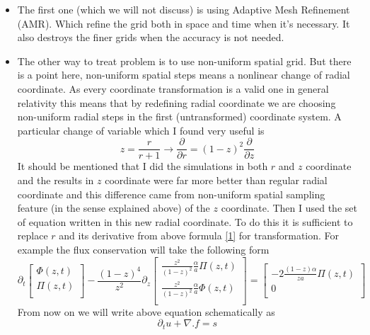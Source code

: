 \documentclass[a4paper,11pt]{article}
\begin{document}
\begin{itemize}
	\item The first one (which we will not discuss) is using Adaptive Mesh Refinement (AMR). Which refine the grid both in space and time  when it's necessary. It also destroys the finer grids when the accuracy is not needed.  
	\item The other way to treat problem is to use non-uniform spatial grid. But there is a point here, non-uniform spatial steps means a nonlinear change of radial coordinate. As every coordinate transformation is a valid one in general relativity this means that by redefining radial coordinate we are choosing non-uniform radial steps in the first (untransformed) coordinate system. A particular change of variable which I found very useful is
	\begin{equation}\label{1}
		z=\frac{r}{r+1}\rightarrow\frac{\partial}{\partial r}=(1-z)^2 \frac{\partial}{\partial z}
	\end{equation} 
	It should be mentioned that I did the simulations in both $r$ and $z$ coordinate and the results in $z$ coordinate were far more better than regular radial coordinate and this difference came from non-uniform spatial sampling feature (in the sense explained above) of the $z$ coordinate.
	Then I used the set of equation written in this new radial coordinate. To do this it is sufficient to replace $r$ and its derivative from above formula \ref{1} for transformation. For example the flux conservation will take the following form
	\begin{equation}\label{2}
	\partial_t\begin{bmatrix}
	\Phi(z,t) \\
	\Pi(z,t) \\
	\end{bmatrix}-\frac{(1-z)^4}{z^2}\partial_z\begin{bmatrix}
	\frac{z^2}{(1-z)^2}\frac{\alpha}{a}\Pi(z,t) \\
	\frac{z^2}{(1-z)^2}\frac{\alpha}{a}\Phi(z,t) \\
	\end{bmatrix}=\begin{bmatrix}
	-2\frac{(1-z)\alpha}{z a}\Pi(z,t) \\
	0 \\
	\end{bmatrix}
	\end{equation}
	From now on we will write above equation schematically as
	\begin{equation*}
		\partial_t u + \nabla .f=s
	\end{equation*} 
\end{itemize}
\end{document}
